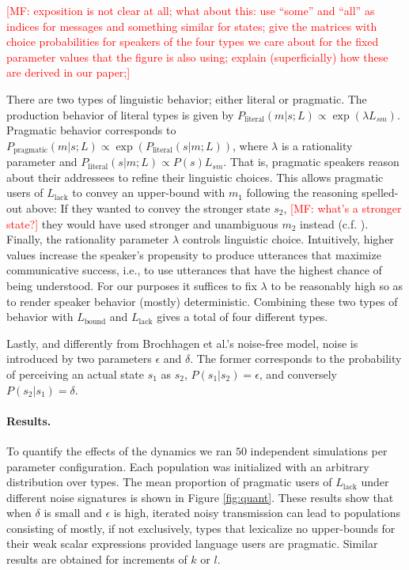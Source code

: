 \documentclass[10pt,a4paper]{article}
\newcommand{\mf}[1]{\textcolor{Red}{[MF: #1]}}
\begin{document}
\mf{exposition is not clear at all; what about this: use ``some'' and ``all'' as indices for
  messages and something similar for states; give the matrices with choice probabilities for
  speakers of the four types we care about for the fixed parameter values that the figure is
  also using; explain (superficially) how these are derived in our paper;}

There are two types of linguistic behavior; either literal or pragmatic. The production
behavior of literal types is given by $P_{\text{literal}}(m|s;L) \propto \exp(\lambda
L_{sm})$. Pragmatic behavior corresponds to $P_{\text{pragmatic}}(m|s;L) \propto
\exp(P_{\text{literal}}(s|m;L))$, where $\lambda$ is a rationality parameter and
$P_{\text{literal}}(s|m;L) \propto P(s) L_{sm}$. That is, pragmatic speakers reason about their
addressees to refine their linguistic choices. This allows pragmatic users of $L_{\text{lack}}$
to convey an upper-bound with $m_1$ following the reasoning spelled-out above: If they wanted
to convey the stronger state $s_2$, \mf{what's a stronger state?} they would have used stronger and unambiguous $m_2$ instead (c.f. \citealt{frank+goodman:2012,franke+jaeger:2014}). Finally, the rationality parameter $\lambda$ controls linguistic choice. Intuitively, higher values increase the speaker's propensity to produce utterances that maximize communicative success, i.e., to use utterances that have the highest chance of being understood. For our purposes it suffices to fix $\lambda$ to be reasonably high so as to render speaker behavior (mostly) deterministic. Combining these two types of behavior with $L_{\text{bound}}$ and $L_{\text{lack}}$ gives a total of four different types.

Lastly, and differently from Brochhagen et al.'s noise-free model, noise is introduced by two parameters $\epsilon$ and $\delta$. The former corresponds to the probability of perceiving an actual state $s_1$ as $s_2$, $P(s_1 | s_2) = \epsilon$, and conversely $P(s_2 | s_1) = \delta$.

\paragraph{Results.} To quantify the effects of the dynamics we ran $50$ independent
simulations per parameter configuration. Each population was initialized with an arbitrary
distribution over types. The mean proportion of pragmatic users of $L_{\text{lack}}$ under
different noise signatures is shown in Figure \ref{fig:quant}. These results show that when
$\delta$ is small and $\epsilon$ is high, iterated noisy transmission can lead to populations
consisting of mostly, if not exclusively, types that lexicalize no upper-bounds for their weak
scalar expressions provided language users are pragmatic.  Similar results are obtained for
increments of $k$ or $l$.
\end{document}
